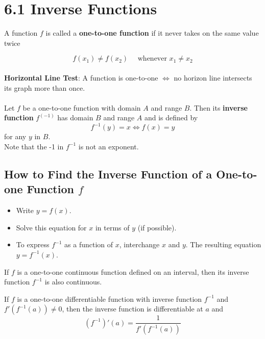 %
%

\section*{6.1 Inverse Functions}

A function \(f\) is called a \textbf{one-to-one function} if it never takes on the same value twice

\[ f(x_1) \neq f(x_2) \quad \text{ whenever } x_1 \neq x_2 \]
\\
\textbf{Horizontal Line Test}: A function is one-to-one \( \Longleftrightarrow \) no horizon line intersects its graph more than once.
\\
\\
Let \(f\) be a one-to-one function with domain \(A\) and range \(B\). Then its \textbf{inverse function} \(f^(-1)\) has domain \(B\) and range \(A\) and is defined by
\[ f^{-1}(y)=x \Leftrightarrow f(x)=y \]
for any \(y\) in \(B\).
\\
Note that the -1 in \(f^{-1}\) is not an exponent.

\subsection*{How to Find the Inverse Function of a One-to-one Function \(f\)}

\begin{itemize}
  \item Write \( y=f(x) \).
  \item Solve this equation for \(x\) in terms of \(y\) (if possible).
  \item To express \(f^{-1}\) as a function of \(x\), interchange \(x\) and \(y\). The resulting equation \(y=f^{-1}(x)\).
\end{itemize}

\begin{definition}
If \(f\) is a one-to-one continuous function defined on an interval, then its inverse function \(f^{-1}\) is also continuous.
\end{definition}

\begin{definition}
If \(f\) is a one-to-one differentiable function with inverse function \( f^{-1}\) and \(f'(f^{-1}(a)) \neq 0 \), then the inverse function is differentiable at \(a\) and 
\[ (f^{-1})'(a) = \frac{1}{f'(f^{-1}(a))} \]
\end{definition}
